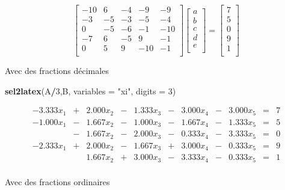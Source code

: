 \documentclass[]{article}
\newenvironment{Shaded}{\begin{snugshade}}{\end{snugshade}}
\newcommand{\DataTypeTok}[1]{\textcolor[rgb]{0.13,0.29,0.53}{#1}}
\newcommand{\DecValTok}[1]{\textcolor[rgb]{0.00,0.00,0.81}{#1}}
\newcommand{\KeywordTok}[1]{\textcolor[rgb]{0.13,0.29,0.53}{\textbf{#1}}}
\newcommand{\NormalTok}[1]{#1}
\newcommand{\OperatorTok}[1]{\textcolor[rgb]{0.81,0.36,0.00}{\textbf{#1}}}
\newcommand{\StringTok}[1]{\textcolor[rgb]{0.31,0.60,0.02}{#1}}
\begin{document}
\[
 \left[
\begin{array}{rrrrr}
-10 & 6 & -4 & -9 & -9 \\ 
-3 & -5 & -3 & -5 & -4 \\ 
0 & -5 & -6 & -1 & -10 \\ 
-7 & 6 & -5 & 9 & -1 \\ 
0 & 5 & 9 & -10 & -1 \\ 
\end{array}
\right] \left[
\begin{array}{c} 
a \\ 
b \\ 
c \\ 
d \\ 
e \\
\end{array}
\right] = \left[
\begin{array}{r}
7 \\ 
5 \\ 
0 \\ 
9 \\ 
1 \\ 
\end{array}
\right] 
\]

Avec des fractions décimales

\begin{Shaded}
\begin{Highlighting}[]
\KeywordTok{sel2latex}\NormalTok{(A}\OperatorTok{/}\DecValTok{3}\NormalTok{,B, }\DataTypeTok{variables =} \StringTok{"xi"}\NormalTok{, }\DataTypeTok{digits =} \DecValTok{3}\NormalTok{)}
\end{Highlighting}
\end{Shaded}

\[
 \begin{array}{rrrrrrrrrrr}
-3.333 x_{1} & + & 2.000 x_{2} & - & 1.333 x_{3} & - & 3.000 x_{4} & - & 3.000 x_{5} & = & 7 \\ 
-1.000 x_{1} & - & 1.667 x_{2} & - & 1.000 x_{3} & - & 1.667 x_{4} & - & 1.333 x_{5} & = & 5 \\ 
& - & 1.667 x_{2} & - & 2.000 x_{3} & - & 0.333 x_{4} & - & 3.333 x_{5} & = & 0 \\ 
-2.333 x_{1} & + & 2.000 x_{2} & - & 1.667 x_{3} & + & 3.000 x_{4} & - & 0.333 x_{5} & = & 9 \\ 
& & 1.667 x_{2} & + & 3.000 x_{3} & - & 3.333 x_{4} & - & 0.333 x_{5} & = & 1 \\ 
\end{array} 
\]

Avec des fractions ordinaires
\end{document}
